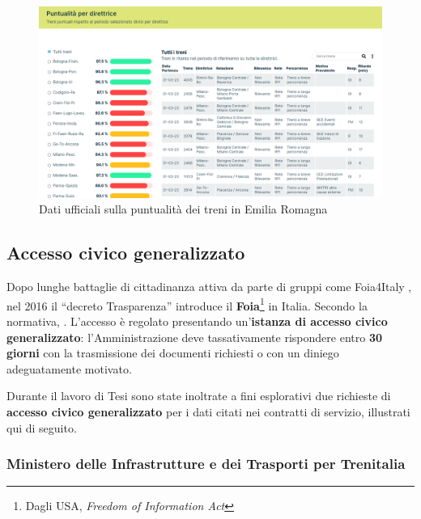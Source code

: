 \documentclass[12pt,a4paper,italian]{report}
\begin{document}
\begin{figure}[h] \centering
    \includegraphics[width=1\textwidth]{images/fer_dati.png}
	\caption{Dati ufficiali sulla puntualità dei treni in Emilia
        Romagna \cite{FerDati}}
    \label{fer_dati}
\end{figure}


\subsection{Accesso civico generalizzato}
\label{foia}

Dopo lunghe battaglie di cittadinanza attiva da parte di gruppi come
Foia4Italy \cite{SilenziDiStato}, nel 2016 il ``decreto Trasparenza''
\cite{Dlgs97} introduce il \textbf{Foia}\footnote{Dagli USA,
    \textit{Freedom of Information Act}} in Italia.  Secondo la
normativa, .
L'accesso è regolato presentando un'\textbf{istanza di accesso civico
    generalizzato}: l'Amministrazione deve tassativamente rispondere
entro \textbf{30 giorni} con la trasmissione dei documenti richiesti o
con un diniego adeguatamente motivato.

Durante il lavoro di Tesi sono state inoltrate a fini esplorativi due
richieste di \textbf{accesso civico generalizzato} per i dati citati
nei contratti di servizio, illustrati qui di seguito.

\subsubsection{Ministero delle Infrastrutture e dei Trasporti per
    Trenitalia}
\end{document}
